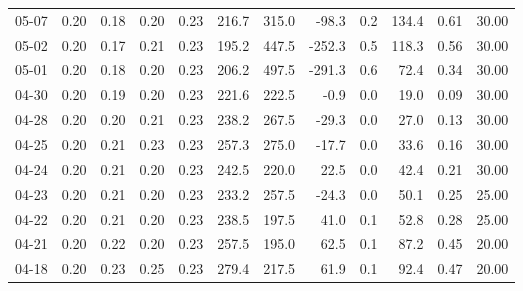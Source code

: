 \begin{threeparttable}
{\begin{tabular}{lrrrrrrrrrrr}
  05-07 &          0.20 &          0.18 &          0.20 &        0.23 &               216.7 &               315.0 &      -98.3 &                 0.2 &            134.4 &            0.61 &                  30.00 \\
  05-02 &          0.20 &          0.17 &          0.21 &        0.23 &               195.2 &               447.5 &     -252.3 &                 0.5 &            118.3 &            0.56 &                  30.00 \\
  05-01 &          0.20 &          0.18 &          0.20 &        0.23 &               206.2 &               497.5 &     -291.3 &                 0.6 &             72.4 &            0.34 &                  30.00 \\
  04-30 &          0.20 &          0.19 &          0.20 &        0.23 &               221.6 &               222.5 &       -0.9 &                 0.0 &             19.0 &            0.09 &                  30.00 \\
  04-28 &          0.20 &          0.20 &          0.21 &        0.23 &               238.2 &               267.5 &      -29.3 &                 0.0 &             27.0 &            0.13 &                  30.00 \\
  04-25 &          0.20 &          0.21 &          0.23 &        0.23 &               257.3 &               275.0 &      -17.7 &                 0.0 &             33.6 &            0.16 &                  30.00 \\
  04-24 &          0.20 &          0.21 &          0.20 &        0.23 &               242.5 &               220.0 &       22.5 &                 0.0 &             42.4 &            0.21 &                  30.00 \\
  04-23 &          0.20 &          0.21 &          0.20 &        0.23 &               233.2 &               257.5 &      -24.3 &                 0.0 &             50.1 &            0.25 &                  25.00 \\
  04-22 &          0.20 &          0.21 &          0.20 &        0.23 &               238.5 &               197.5 &       41.0 &                 0.1 &             52.8 &            0.28 &                  25.00 \\
  04-21 &          0.20 &          0.22 &          0.20 &        0.23 &               257.5 &               195.0 &       62.5 &                 0.1 &             87.2 &            0.45 &                  20.00 \\
  04-18 &          0.20 &          0.23 &          0.25 &        0.23 &               279.4 &               217.5 &       61.9 &                 0.1 &             92.4 &            0.47 &                  20.00 \\

\end{tabular}}
\end{threeparttable}
